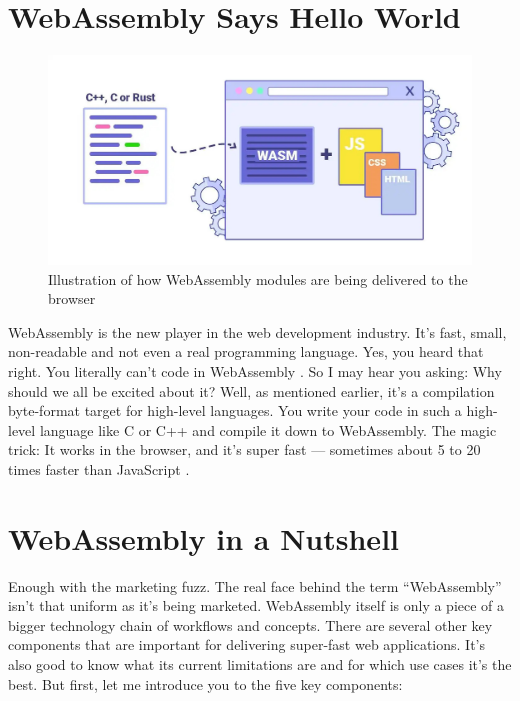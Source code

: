 \documentclass[10pt]{article}
\begin{document}
\begin{sloppypar}
  \section{WebAssembly Says Hello World}
  \label{sec:hello-world}

  \begin{figure}[ht]
    \centering
    \includegraphics[width=\textwidth]{figures/004.jpg}
    \caption{Illustration of how WebAssembly modules are being delivered to the browser \citep{logrocket_logrocket_nodate}}
    \label{fig:wasm}
  \end{figure}

  WebAssembly is the new player in the web development industry. It’s fast, small, non-readable and not even a real programming language. Yes, you heard that right. You literally can’t code in WebAssembly \citep{rourke_learn_2018}. So I may hear you asking: Why should we all be excited about it? Well, as mentioned earlier, it’s a compilation byte-format target for high-level languages. You write your code in such a high-level language like C or C++ and compile it down to WebAssembly. The magic trick: It works in the browser, and it’s super fast — sometimes about 5 to 20 times faster than JavaScript \citep{aboukhalil_how_0200}.

  \section{WebAssembly in a Nutshell}
  \label{sec:in-a-nutshell}

  Enough with the marketing fuzz. The real face behind the term “WebAssembly” isn’t that uniform as it’s being marketed. WebAssembly itself is only a piece of a bigger technology chain of workflows and concepts. There are several other key components that are important for delivering super-fast web applications. It’s also good to know what its current limitations are and for which use cases it’s the best. But first, let me introduce you to the five key components:


\end{sloppypar}
\end{document}
